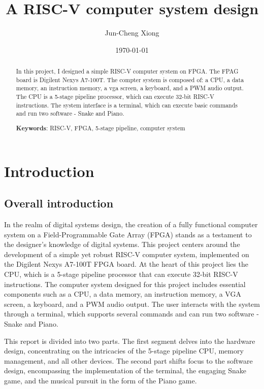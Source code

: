 \documentclass[
	a4paper, %
	11pt, %
]{CSUniSchoolLabReport}
\title{A RISC-V computer system design} %
\author{Jun-Cheng Xiong} %
\date{\today} %
\begin{document}
\maketitle %


\begin{abstract}
    In this project, I designed a simple RISC-V computer system on FPGA. The FPAG board is Digilent Nexys A7-100T. The compter system is composed of: a CPU, a data memory, an instruction memory, a vga screen, a keyboard, and a PWM audio output. The CPU is a 5-stage pipeline processor, which can execute 32-bit RISC-V instructions. The system interface is a terminal, which can execute basic commands and run two software - Snake and Piano.

    \textbf{Keywords}: RISC-V, FPGA, 5-stage pipeline, computer system
\end{abstract}
\newpage

\thispagestyle{empty}
\tableofcontents

\newpage
\setcounter{page}{1}
\section{Introduction}
\subsection{Overall introduction}

In the realm of digital systems design, the creation of a fully functional computer system on a Field-Programmable Gate Array (FPGA) stands as a testament to the designer's knowledge of digital systems. This project centers around the development of a simple yet robust RISC-V computer system, implemented on the Digilent Nexys A7-100T FPGA board. At the heart of this project lies the CPU, which is a 5-stage pipeline processor that can execute 32-bit RISC-V instructions. The computer system designed for this project includes essential components such as a CPU, a data memory, an instruction memory, a VGA screen, a keyboard, and a PWM audio output. The user interacts with the system through a terminal, which supports several commands and can run two software - Snake and Piano.

This report is divided into two parts. The first segment delves into the hardware design, concentrating on the intricacies of the 5-stage pipeline CPU, memory management, and all other devices. The second part shifts focus to the software design, encompassing the implementation of the terminal, the engaging Snake game, and the musical pursuit in the form of the Piano game.
\end{document}
